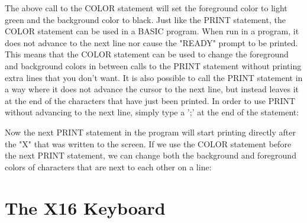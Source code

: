 
The above call to the {\ttfamily COLOR} statement will set the foreground color
to light green and the background color to black.  Just like the {\ttfamily
PRINT} statement, the {\ttfamily COLOR} statement can be used in a BASIC
program.  When run in a program, it does not advance to the next line nor cause
the "READY" prompt to be printed.  This means that the {\ttfamily COLOR}
statement can be used to change the foreground and background colors in between
calls to the {\ttfamily PRINT} statement without printing extra lines that you
don't want.  It is also possible to call the {\ttfamily PRINT} statement in a
way where it does not advance the cursor to the next line, but instead leaves
it at the end of the characters that have just been printed.  In order to use
{\ttfamily PRINT} without advancing to the next line, simply type a ';' at the
end of the statement:\\


Now the next {\ttfamily PRINT} statement in the program will start printing
directly after the "X" that was written to the screen.  If we use the
{\ttfamily COLOR} statement before the next {\ttfamily PRINT} statement, we can
change both the background and foreground colors of characters that are next to
each other on a line:\\



\chapter*{The X16 Keyboard}

